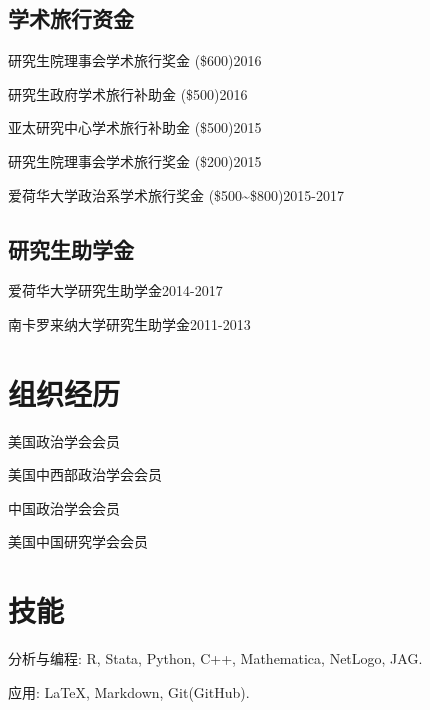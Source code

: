 \documentclass[10.5pt,]{article}
\providecommand{\tightlist}{%
  \setlength{\itemsep}{0pt}\setlength{\parskip}{0pt}}
\renewenvironment{itemize}{
  \begin{list}{}{
    \setlength{\leftmargin}{1.5em}
  }
}{
  \end{list}
}
\begin{document}
\subsection{学术旅行资金}

\begin{itemize}
\tightlist
\item
  研究生院理事会学术旅行奖金 (\$600)\hfill 2016
\item
  研究生政府学术旅行补助金 (\$500)\hfill 2016
\item
  亚太研究中心学术旅行补助金 (\$500)\hfill 2015
\item
  研究生院理事会学术旅行奖金 (\$200)\hfill 2015
\item
  爱荷华大学政治系学术旅行奖金
  (\$500\textasciitilde{}\$800)\hfill 2015-2017
\end{itemize}

\subsection{研究生助学金}

\begin{itemize}
\tightlist
\item
  爱荷华大学研究生助学金\hfill 2014-2017
\item
  南卡罗来纳大学研究生助学金\hfill 2011-2013
\end{itemize}

\section{组织经历}

\begin{itemize}
\tightlist
\item
  美国政治学会会员
\item
  美国中西部政治学会会员
\item
  中国政治学会会员
\item
  美国中国研究学会会员
\end{itemize}

\section{技能}

\begin{itemize}
\tightlist
\item
  分析与编程: R, Stata, Python, C++, Mathematica, NetLogo, JAG.
\item
  应用: \LaTeX, Markdown, Git(GitHub).
\end{itemize}
\end{document}
